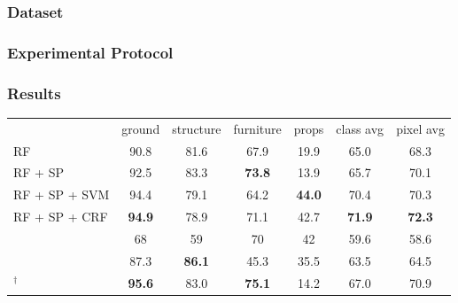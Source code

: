 \documentclass[final,ignorenonframetext,compress]{beamer}
\begin{document}
    \begin{frame}
        \frametitle{Dataset}
    \end{frame}
    

    \begin{frame}
        \frametitle{Experimental Protocol}
    \end{frame}

    \begin{frame}
        \frametitle{Results}
        \begin{table}[t]
        \begin{tabularx}{\linewidth}{@{\extracolsep{\fill}}lcccccc}
        \toprule
                                & \footnotesize ground        & \footnotesize  structure    & \footnotesize furniture     & \footnotesize props         & \footnotesize class avg   & \footnotesize pixel avg\\
        \cmidrule(r){1-7}

        \footnotesize RF                              &         90.8  &   81.6        & 67.9          & 19.9          &  65.0        &  68.3 \\
        \footnotesize RF + SP                         &         92.5  &   83.3        & \textbf{73.8} & 13.9          &  65.7        &  70.1 \\ 
        \footnotesize RF + SP + SVM                   &         94.4  &   79.1        & 64.2          & \textbf{44.0} &  70.4        &  70.3 \\
        \footnotesize RF + SP + CRF                   & \textbf{94.9} &   78.9        &          71.1 & 42.7          &\textbf{71.9} &  \textbf{72.3} \\
        \cmidrule(r){1-7}
        \footnotesize \citet{SilbermanECCV12}         &         68    &   59          & 70           & 42            &  59.6        & 58.6 \\
        \footnotesize \citet{couprie-iclr-13}         &         87.3  & \textbf{86.1} & 45.3         & 35.5          &  63.5        & 64.5 \\
        \cmidrule(r){1-7}
        \footnotesize \citet{stueckler2013}$^\dagger$ & \textbf{95.6} &   83.0        & \textbf{75.1}& 14.2          &  67.0        & 70.9 \\

        \bottomrule
        \end{tabularx}
        \end{table}
    \end{frame}
\end{document}
